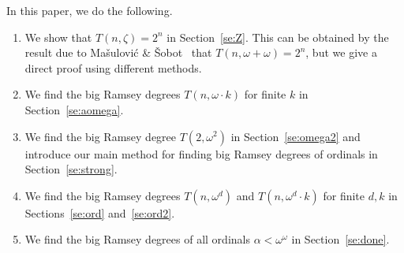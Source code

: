 \documentclass[10pt,a4paper]{article}
\newcommand{\om}{\omega}
\newcommand{\numpoints}{n}
\theoremstyle{plain}
\theoremstyle{definition}
\begin{document}
In this paper, we do the following.

\begin{enumerate}
\item
We show that $T(\numpoints,\zeta)=2^{\numpoints}$ in Section~\ref{se:Z}. This can be obtained
by the result due to Ma\v{s}ulovi\'{c} \& \v{S}obot~\cite{MS-2021} that 
$T(\numpoints,\omega+\omega)=2^\numpoints$, but we give a direct proof using different methods.
\item
We find the big Ramsey degrees $T(n, \om \cdot k)$ for finite $k$ in Section~\ref{se:aomega}.
\item
We find the big Ramsey degree $T(2, \om^2)$ in Section~\ref{se:omega2} 
and introduce our main method for finding big Ramsey degrees of ordinals
in Section~\ref{se:strong}.
\item We find the big Ramsey degrees $T(n, \om^d)$ and
$T(n, \om^d \cdot k)$ for finite $d,k$ in Sections~\ref{se:ord} and~\ref{se:ord2}.
\item We find the big Ramsey degrees of all ordinals $\alpha<\omega^\omega$
in Section~\ref{se:done}.
\end{enumerate}







\end{document}

